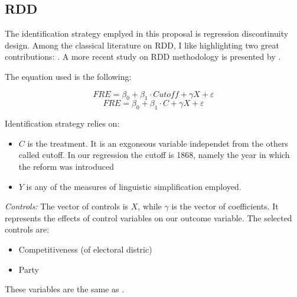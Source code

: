 \subsection{RDD}
The identification strategy emplyed in this proposal is regression discontinuity design. Among the classical literature on RDD, I like highlighting two great contributions: \textcite{fujiwaraVotingTechnologyPolitical2015, gulzarPoliticiansBureaucratsDevelopment2017}. A more recent study on RDD methodology is presented by \textcite{cattaneoPracticalIntroductionRegression2024}.

The equation used is the following:

\vspace*{0.3em}
\[
FRE = \beta_0 + \beta_1 \cdot Cutoff + \gamma X + \varepsilon
\]
\vspace*{0.1em}
\[
FRE = \beta_0 + \beta_1 \cdot C + \gamma X + \varepsilon
\]

\vspace*{1em}
Identification strategy relies on:
\begin{itemize}
    \item[-] \small{\(C\)} is the treatment. It is an exgoneous variable independet from the others called cutoff. In our regression the cutoff is 1868, namely the year in which the reform was introduced
    \item[-] \small{\(Y\)} is any of the measures of linguistic simplification employed.
\end{itemize}

\vspace*{1em}
\textit{Controls:} The vector of controls is \small{\(X\)}, while \small{\(\gamma\)} is the vector of coefficients. It represents the effects of control variables on our outcome variable. The selected controls are:
\begin{itemize}
    \item[-] Competitiveness (of electoral distric)
    \item[-] Party
\end{itemize}
These variables are the same as \textcite{spirlingDemocratizationLinguisticComplexity2016}.


